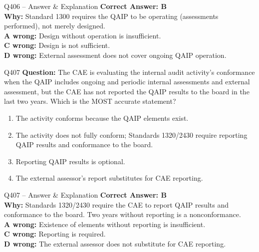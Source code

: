 \documentclass[aspectratio=169,10pt]{beamer}
\begin{document}
	\begin{frame}[t]{Q406 -- Answer \& Explanation}
		\small
		\textbf{Correct Answer: B} \\[4pt]
		\textbf{Why:} Standard 1300 requires the QAIP to be operating (assessments performed), not merely designed. \\[4pt]
		\textbf{A wrong:} Design without operation is insufficient. \\[2pt]
		\textbf{C wrong:} Design is not sufficient. \\[2pt]
		\textbf{D wrong:} External assessment does not cover ongoing QAIP operation.
	\end{frame}
	
	\begin{frame}[t]{Q407}
		\small
		\textbf{Question:} The CAE is evaluating the internal audit activity's conformance when the QAIP includes ongoing and periodic internal assessments and external assessment, but the CAE has not reported the QAIP results to the board in the last two years. Which is the MOST accurate statement?
		\begin{enumerate}[label=\Alph*.,itemsep=1pt,topsep=2pt]
			\item The activity conforms because the QAIP elements exist.
			\item The activity does not fully conform; Standards 1320/2430 require reporting QAIP results and conformance to the board.
			\item Reporting QAIP results is optional.
			\item The external assessor's report substitutes for CAE reporting.
		\end{enumerate}
	\end{frame}
	
	\begin{frame}[t]{Q407 -- Answer \& Explanation}
		\small
		\textbf{Correct Answer: B} \\[4pt]
		\textbf{Why:} Standards 1320/2430 require the CAE to report QAIP results and conformance to the board. Two years without reporting is a nonconformance. \\[4pt]
		\textbf{A wrong:} Existence of elements without reporting is insufficient. \\[2pt]
		\textbf{C wrong:} Reporting is required. \\[2pt]
		\textbf{D wrong:} The external assessor does not substitute for CAE reporting.
	\end{frame}
	
\end{document}
